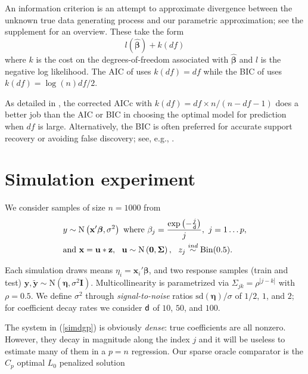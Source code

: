 \documentclass[12pt]{article}
\newcommand{\bs}[1]{\boldsymbol{#1}}
\newcommand{\mr}[1]{\mathrm{#1}}
\newcommand{\bm}[1]{\mathbf{#1}}
\begin{document}
An information criterion is an attempt to approximate
 divergence between the unknown true data generating
process and our parametric approximation; see the supplement for an
overview.  These  take the form
\begin{equation}
l(\bs{\hat\beta}) + k(df)
\end{equation}
where $k$ is the cost on the degrees-of-freedom associated with
 $\bs{\hat\beta}$ and $l$ is the negative log likelihood.  The AIC of
\cite{akaike_information_1973} uses $k(df) = df$ while the BIC of \cite{schwarz_estimating_1978}
uses $k(df) = \log(n)df/2$.

As detailed in \cite{flynn_efficiency_2013}, the corrected AICc with $k(df) =
df\times n/(n-df-1)$ does a better job than the AIC or BIC in choosing the
optimal model for prediction when $df$ is large.  Alternatively, the BIC is often preferred
for accurate support recovery or avoiding false discovery; see, e.g.,
\cite{zou_degrees_2007}.


\section{Simulation experiment}
\label{sec:sim}

We consider samples of size $n=1000$ from
\begin{align}
\label{simdgp}
&y \sim \mr{N}\left(\bm{x}'\bs{\beta},\sigma^2\right)~\text{where}~\beta_j = \frac{\exp\left(-\frac{j}{\sf d}\right)}{j},~j=1\ldots p,\notag\\
&\text{and}~\bm{x} = \bm{u}*\bm{z},~~\bm{u}\sim \mr{N}\left(\bm{0},\bs{\Sigma}\right),~~z_{j} \stackrel{ind}{\sim} \mr{Bin}(0.5).
\end{align}

\vspace{-.4cm}
\noindent
Each simulation draws means $\eta_i =
\bm{x}_i'\bs{\beta}$, and two response samples (train and test)
$\bm{y},\bm{\tilde y} \sim \mr{N}(\bs{\eta},\sigma^2\bm{I})$. Multicollinearity is
parametrized via $\Sigma_{jk} =
\rho^{|j-k|}$ with $\rho = 0.5$.  We define $\sigma^2$ through {\it signal-to-noise} ratios
$\mr{sd}(\bs{\eta})/\sigma$ of $1/2$, $1$, and $2$; for coefficient decay rates we consider
${\sf d}$ of $10$, $50$, and $100$.

The system in (\ref{simdgp}) is obviously {\it dense}:  true
coefficients are all nonzero.  However, they decay in magnitude along the
index $j$ and
it will be useless to estimate many of them in a $p=n$ regression.
Our sparse oracle comparator is the $C_p$ optimal $L_0$ penalized solution
\end{document}

